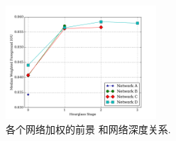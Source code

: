 \renewcommand{\captiontitle}{各个网络加权的前景 \IoU{} 和网络深度关系}
\begin{figure}
\begin{center}
\includegraphics[width=0.5\textwidth]{./data/trendline.pdf}
\caption[\captiontitle]{\captiontitle{}.}
\label{fig:hourglass-accuracy}
\end{center}
\end{figure}
